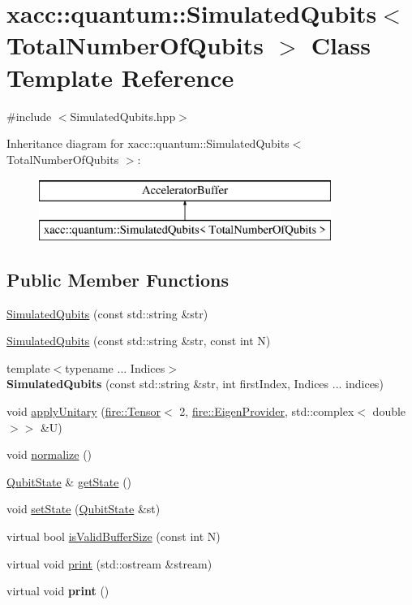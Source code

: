 \hypertarget{a01248}{}\section{xacc\+:\+:quantum\+:\+:Simulated\+Qubits$<$ Total\+Number\+Of\+Qubits $>$ Class Template Reference}
\label{a01248}


{\ttfamily \#include $<$Simulated\+Qubits.\+hpp$>$}

Inheritance diagram for xacc\+:\+:quantum\+:\+:Simulated\+Qubits$<$ Total\+Number\+Of\+Qubits $>$\+:\begin{figure}[H]
\begin{center}
\leavevmode
\includegraphics[height=2.000000cm]{a01248}
\end{center}
\end{figure}
\subsection*{Public Member Functions}
\begin{DoxyCompactItemize}
\item 
\hyperlink{a01248_afeb610fbd0c761caa15136e77260ba48}{Simulated\+Qubits} (const std\+::string \&str)
\item 
\hyperlink{a01248_a3d0f465d821565c582c37b6b4d7e4f79}{Simulated\+Qubits} (const std\+::string \&str, const int N)
\item 
\mbox{\label{a01248_a7d965030bc5f7a39ddd7d325e8f11c4b}} 
{\footnotesize template$<$typename ... Indices$>$ }\\{\bfseries Simulated\+Qubits} (const std\+::string \&str, int first\+Index, Indices ... indices)
\item 
void \hyperlink{a01248_a97ecaaf5aab14bc017726fe9cfd41c46}{apply\+Unitary} (\hyperlink{a01812}{fire\+::\+Tensor}$<$ 2, \hyperlink{a01808}{fire\+::\+Eigen\+Provider}, std\+::complex$<$ double $>$$>$ \&U)
\item 
void \hyperlink{a01248_aea8a0358100e815a7c70eee7f8ba9d45}{normalize} ()
\item 
\hyperlink{a01812}{Qubit\+State} \& \hyperlink{a01248_a75b8fde8e812931fe087cb078108c00d}{get\+State} ()
\item 
void \hyperlink{a01248_a2a0e202f943d3ec8d848c7e25062c6e1}{set\+State} (\hyperlink{a01812}{Qubit\+State} \&st)
\item 
virtual bool \hyperlink{a01248_ac689b60b0218bf8d0c11ef2f151e7272}{is\+Valid\+Buffer\+Size} (const int N)
\item 
virtual void \hyperlink{a01248_ad9a39b44161fa0309167b9791ed10945}{print} (std\+::ostream \&stream)
\item 
\mbox{\label{a01248_a7cda9427b5a0d3eaa9573eb9d992f51c}} 
virtual void {\bfseries print} ()
\end{DoxyCompactItemize}
